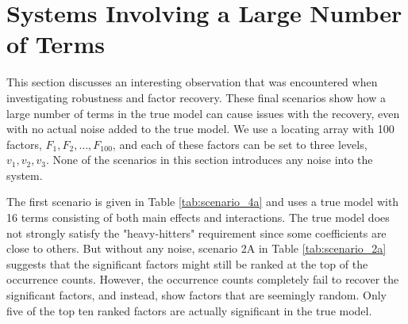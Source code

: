 \section{Systems Involving a Large Number of Terms} \label{sect:interesting}

This section discusses an interesting observation that was encountered when investigating robustness and factor recovery.
These final scenarios show how a large number of terms in the true model can cause issues with the recovery, even with no actual noise added to the true model.
We use a locating array with 100 factors, $F_{1}, F_{2}, \dots, F_{100}$, and each of these factors can be set to three levels, $v_1, v_2, v_3$.
None of the scenarios in this section introduces any noise into the system.

The first scenario is given in Table \ref{tab:scenario_4a} and uses a true model with 16 terms consisting of both main effects and interactions.
The true model does not strongly satisfy the "heavy-hitters" requirement since some coefficients are close to others.
But without any noise, scenario 2A in Table \ref{tab:scenario_2a} suggests that the significant factors might still be ranked at the top of the occurrence counts.
However, the occurrence counts completely fail to recover the significant factors, and instead, show factors that are seemingly random.
Only five of the top ten ranked factors are actually significant in the true model.

